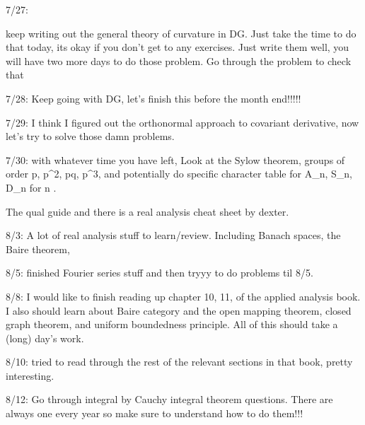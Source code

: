 7/27:

keep writing out the general theory of curvature in DG. Just take the time to do that today, its okay if you don't get to any exercises. Just write them well, you will have two more days to do those problem. Go through the problem to check that 


7/28: Keep going with DG, let's finish this before the month end!!!!!

7/29: I think I figured out the orthonormal approach to covariant derivative, now let's try to solve those damn problems.



7/30: with whatever time you have left, Look at the Sylow theorem, groups of order p, p^2, pq, p^3, and potentially do specific character table for A_n, S_n, D_n for n . 



The qual guide and there is a real analysis cheat sheet by dexter. 

8/3: A lot of real analysis stuff to learn/review. Including Banach spaces, the Baire theorem, 



8/5: finished Fourier series stuff and then tryyy to do problems til 8/5.


8/8: I would like to finish reading up chapter 10, 11, of the applied analysis book. I also should learn about Baire category and the open mapping theorem, closed graph theorem, and uniform boundedness principle. All of this should take a (long) day's work.


8/10: tried to read through the rest of the relevant sections in that book, pretty interesting.


8/12: Go through integral by Cauchy integral theorem questions. There are always one every year so make sure to understand how to do them!!!

